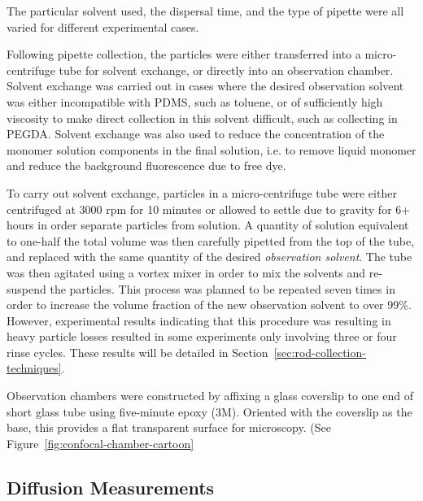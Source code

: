 The particular solvent used, the dispersal time, and the type of pipette were all varied for different experimental
cases.

Following pipette collection, the particles were either transferred into a micro-centrifuge tube for solvent 
exchange, or directly into an observation chamber.  Solvent exchange was carried out in cases where the desired
observation solvent was either incompatible with PDMS, such as toluene, or of sufficiently high viscosity to make
direct collection in this solvent difficult, such as collecting in PEGDA.  Solvent exchange was also used to reduce
the concentration of the monomer solution components in the final solution, i.e. to remove liquid monomer and 
reduce the background fluorescence due to free dye.

To carry out solvent exchange, particles in a micro-centrifuge tube were either centrifuged at 3000 rpm for 10 minutes or
allowed to settle due to gravity for 6+ hours in order separate particles from solution.  A quantity of solution equivalent
to one-half the total volume was then carefully pipetted from the top of the tube, and replaced with the same quantity of 
the desired \textit{observation solvent}.  The tube was then agitated using a vortex mixer in order to mix the solvents and
re-suspend the particles.  This process was planned to be repeated seven times in order to increase the volume fraction of
the new observation solvent to over 99\%.  However, experimental results indicating that this procedure was resulting in heavy
particle losses resulted in some experiments only involving three or four rinse cycles.  These results will be detailed in 
Section~\ref{sec:rod-collection-techniques}.



Observation chambers were constructed by affixing a glass coverslip to one end of short glass tube using 
five-minute epoxy (3M).  Oriented with the coverslip as the base, this provides a flat transparent surface
for microscopy. (See Figure~\ref{fig:confocal-chamber-cartoon}


\subsection{Diffusion Measurements}
\label{sec:exp-diffusion}

